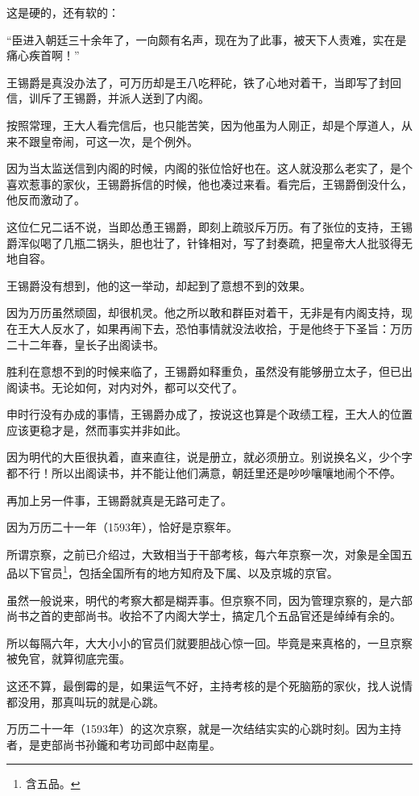 \begin{multicols}{\theparacolNo}
这是硬的，还有软的：

“臣进入朝廷三十余年了，一向颇有名声，现在为了此事，被天下人责难，实在是痛心疾首啊！”

王锡爵是真没办法了，可万历却是王八吃秤砣，铁了心地对着干，当即写了封回信，训斥了王锡爵，并派人送到了内阁。

按照常理，王大人看完信后，也只能苦笑，因为他虽为人刚正，却是个厚道人，从来不跟皇帝闹，可这一次，是个例外。

因为当太监送信到内阁的时候，内阁的张位恰好也在。这人就没那么老实了，是个喜欢惹事的家伙，王锡爵拆信的时候，他也凑过来看。看完后，王锡爵倒没什么，他反而激动了。

这位仁兄二话不说，当即怂恿王锡爵，即刻上疏驳斥万历。有了张位的支持，王锡爵浑似喝了几瓶二锅头，胆也壮了，针锋相对，写了封奏疏，把皇帝大人批驳得无地自容。

王锡爵没有想到，他的这一举动，却起到了意想不到的效果。

因为万历虽然顽固，却很机灵。他之所以敢和群臣对着干，无非是有内阁支持，现在王大人反水了，如果再闹下去，恐怕事情就没法收拾，于是他终于下圣旨：万历二十二年春，皇长子出阁读书。

胜利在意想不到的时候来临了，王锡爵如释重负，虽然没有能够册立太子，但已出阁读书。无论如何，对内对外，都可以交代了。

申时行没有办成的事情，王锡爵办成了，按说这也算是个政绩工程，王大人的位置应该更稳才是，然而事实并非如此。

因为明代的大臣很执着，直来直往，说是册立，就必须册立。别说换名义，少个字都不行！所以出阁读书，并不能让他们满意，朝廷里还是吵吵嚷嚷地闹个不停。

再加上另一件事，王锡爵就真是无路可走了。

因为万历二十一年（1593年），恰好是京察年。

所谓京察，之前已介绍过，大致相当于干部考核，每六年京察一次，对象是全国五品以下官员\footnote{含五品。}，包括全国所有的地方知府及下属、以及京城的京官。

虽然一般说来，明代的考察大都是糊弄事。但京察不同，因为管理京察的，是六部尚书之首的吏部尚书。收拾不了内阁大学士，搞定几个五品官还是绰绰有余的。

所以每隔六年，大大小小的官员们就要胆战心惊一回。毕竟是来真格的，一旦京察被免官，就算彻底完蛋。

这还不算，最倒霉的是，如果运气不好，主持考核的是个死脑筋的家伙，找人说情都没用，那真叫玩的就是心跳。

万历二十一年（1593年）的这次京察，就是一次结结实实的心跳时刻。因为主持者，是吏部尚书孙鑨和考功司郎中赵南星。


\end{multicols}

